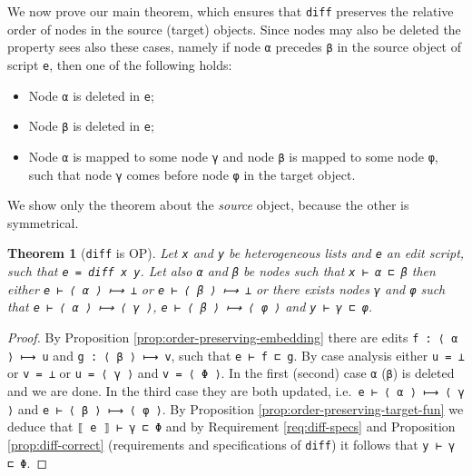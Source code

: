 \documentclass{sigplanconf}
\theoremstyle{plain}
\newtheorem{thm}{Theorem}
\begin{document}
We now prove our main theorem, which ensures that
\texttt{diff} preserves the relative order of nodes in the
source (target) objects.
%
Since nodes may also be deleted the property sees also these cases,
namely if node \texttt{α} precedes \texttt{β} in the source object of
script \texttt{e}, then one of the following holds:
    \begin{itemize}
    \item Node \texttt{α} is deleted in \texttt{e};
    \item Node \texttt{β} is deleted in \texttt{e};
    \item Node \texttt{α} is mapped to some node \texttt{γ} and node
      \texttt{β} is mapped to some node \texttt{φ}, such that node
      \texttt{γ} comes before node \texttt{φ} in the target object.
    \end{itemize}
%
    We show only the theorem about the \emph{source} object, because
    the other is symmetrical.
\begin{thm}[\texttt{diff} is OP]
  Let \texttt{x} and \texttt{y} be heterogeneous lists and \texttt{e}
  an edit script, such that \texttt{e = diff x y}. Let also \texttt{α}
  and \texttt{β} be nodes such that \texttt{x ⊢ α ⊏ β} then either
  \texttt{e ⊢ ⟨ α ⟩ ⟼ ⊥} or \texttt{e ⊢ ⟨ β ⟩ ⟼ ⊥} or there exists nodes
  \texttt{γ} and \texttt{φ} such that \texttt{e ⊢ ⟨ α ⟩ ⟼ ⟨ γ ⟩},
  \texttt{e ⊢ ⟨ β ⟩ ⟼ ⟨ φ ⟩} and \texttt{y ⊢ γ ⊏ φ}.
\end{thm}
\begin{proof}
  By Proposition \ref{prop:order-preserving-embedding} there are edits
  \texttt{f : ⟨ α ⟩ ⟼ u} and \texttt{g : ⟨ β ⟩ ⟼ v}, such that
  \texttt{e ⊢ f ⊏ g}.
  By case analysis either \texttt{u = ⊥} or \texttt{v = ⊥} or \texttt{u = ⟨ γ ⟩}
  and \texttt{v = ⟨ Φ ⟩}. In the first (second) case \texttt{α} (\texttt{β}) is deleted and we are done.
  In the third case they are both updated, i.e.\ \texttt{e ⊢ ⟨ α ⟩ ⟼ ⟨ γ ⟩} and
  \texttt{e ⊢ ⟨ β ⟩ ⟼ ⟨ φ ⟩}.
  By Proposition \ref{prop:order-preserving-target-fun} we deduce that
  \texttt{⟦ e ⟧ ⊢ γ ⊏ Φ} and by Requirement \ref{req:diff-specs} and
  Proposition \ref{prop:diff-correct} (requirements and specifications
  of \texttt{diff}) it follows that \texttt{y ⊢ γ ⊏ Φ}.
\end{proof}
\end{document}
